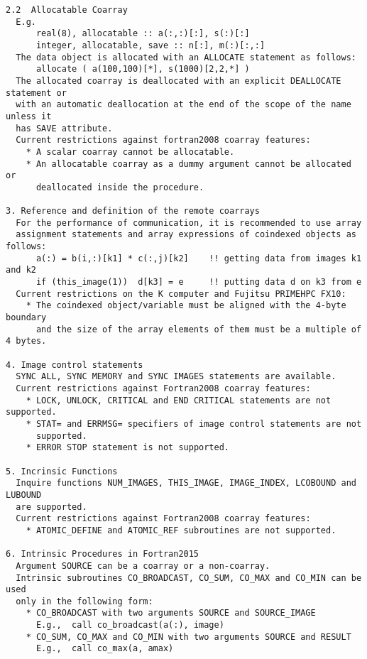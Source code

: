\begin{verbatim}
2.2  Allocatable Coarray
  E.g.
      real(8), allocatable :: a(:,:)[:], s(:)[:]
      integer, allocatable, save :: n[:], m(:)[:,:]
  The data object is allocated with an ALLOCATE statement as follows:
      allocate ( a(100,100)[*], s(1000)[2,2,*] )
  The allocated coarray is deallocated with an explicit DEALLOCATE statement or 
  with an automatic deallocation at the end of the scope of the name unless it 
  has SAVE attribute.
  Current restrictions against fortran2008 coarray features:
    * A scalar coarray cannot be allocatable.
    * An allocatable coarray as a dummy argument cannot be allocated or 
      deallocated inside the procedure.
    
3. Reference and definition of the remote coarrays
  For the performance of communication, it is recommended to use array 
  assignment statements and array expressions of coindexed objects as follows:
      a(:) = b(i,:)[k1] * c(:,j)[k2]    !! getting data from images k1 and k2
      if (this_image(1))  d[k3] = e     !! putting data d on k3 from e
  Current restrictions on the K computer and Fujitsu PRIMEHPC FX10:
    * The coindexed object/variable must be aligned with the 4-byte boundary 
      and the size of the array elements of them must be a multiple of 4 bytes.
  
4. Image control statements
  SYNC ALL, SYNC MEMORY and SYNC IMAGES statements are available.
  Current restrictions against Fortran2008 coarray features:
    * LOCK, UNLOCK, CRITICAL and END CRITICAL statements are not supported.
    * STAT= and ERRMSG= specifiers of image control statements are not 
      supported.
    * ERROR STOP statement is not supported.
    
5. Incrinsic Functions
  Inquire functions NUM_IMAGES, THIS_IMAGE, IMAGE_INDEX, LCOBOUND and LUBOUND
  are supported.
  Current restrictions against Fortran2008 coarray features:
    * ATOMIC_DEFINE and ATOMIC_REF subroutines are not supported.

6. Intrinsic Procedures in Fortran2015
  Argument SOURCE can be a coarray or a non-coarray.
  Intrinsic subroutines CO_BROADCAST, CO_SUM, CO_MAX and CO_MIN can be used 
  only in the following form:
    * CO_BROADCAST with two arguments SOURCE and SOURCE_IMAGE
      E.g.,  call co_broadcast(a(:), image)
    * CO_SUM, CO_MAX and CO_MIN with two arguments SOURCE and RESULT
      E.g.,  call co_max(a, amax)



\end{verbatim}
